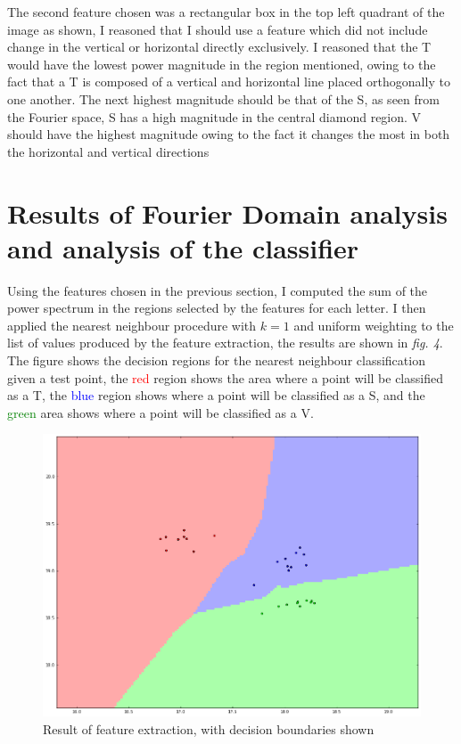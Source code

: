 \documentclass[a4paper,12px,twocolumn]{article}
\begin{document}
\begin{flushleft}
    The second feature chosen was a rectangular box in the top left quadrant of the image as shown, I reasoned that
    I should use a feature which did not include change in the vertical or horizontal directly exclusively.
    I reasoned that the T would have the lowest power magnitude in the region mentioned, owing to the fact that a T
    is composed of a vertical and horizontal line placed orthogonally to one another. The next highest magnitude should
    be that of the S, as seen from the Fourier space, S has a high magnitude in the central diamond region. V should have
    the highest magnitude owing to the fact it changes the most in both the horizontal and vertical directions


\section{Results of Fourier Domain analysis and analysis of the classifier}

    Using the features chosen in the previous section, I computed the sum of the power spectrum in the regions selected
    by the features for each letter. I then applied the nearest neighbour procedure with $k=1$ and uniform weighting to the list of
    values produced by the feature extraction, the results are shown in \textit{fig. 4}. The figure shows the decision regions for the
    nearest neighbour classification given a test point, the \textcolor{red}{red} region shows the area where a point will be classified as a T,
    the \textcolor{blue}{blue} region shows where a point will be classified as a S, and the \textcolor{green}{green} area shows where a point will be classified
    as a V.



    \begin{figure}[h!]
      \caption{Result of feature extraction, with decision boundaries shown}
      \includegraphics[scale=0.25]{decision}
    \end{figure}




\end{flushleft}
\end{document}

